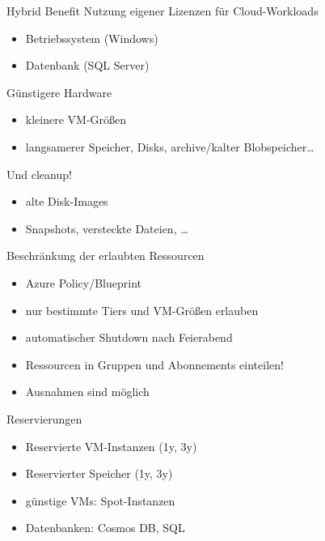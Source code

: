 \begin{flashcard}[Definition]{Hybrid Benefit}
  Nutzung eigener Lizenzen für Cloud-Workloads
  \begin{itemize}
    \item Betriebssystem (Windows)
    \item Datenbank (SQL Server)
  \end{itemize}
\end{flashcard}

\begin{flashcard}[Definition]{Günstigere Hardware}
  \begin{itemize}
    \item kleinere VM-Größen
    \item langsamerer Speicher, Disks, archive/kalter Blobspeicher\ldots
  \end{itemize}
  Und cleanup!
  \begin{itemize}
    \item alte Disk-Images
    \item Snapshots, versteckte Dateien, \ldots
  \end{itemize}
\end{flashcard}

\begin{flashcard}[Definition]{Beschränkung der erlaubten Ressourcen}
  \begin{itemize}
    \item Azure Policy/Blueprint
    \item nur bestimmte Tiers und VM-Größen erlauben
    \item automatischer Shutdown nach Feierabend
    \item Ressourcen in Gruppen und Abonnements einteilen!
    \item Ausnahmen sind möglich
  \end{itemize}
\end{flashcard}

\begin{flashcard}[Definition]{Reservierungen}
  \begin{itemize}
    \item Reservierte VM-Instanzen (1y, 3y)
    \item Reservierter Speicher (1y, 3y)
    \item günstige VMs: Spot-Instanzen
    \item Datenbanken: Cosmos DB, SQL
  \end{itemize}
\end{flashcard}

